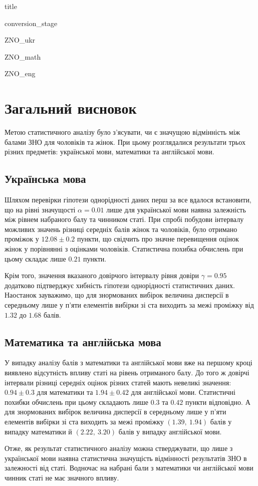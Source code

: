 \documentclass[a4paper,14pt]{extarticle} %
\numberwithin{equation}{section}
\begin{document}
{title}

\tableofcontents

\newpage
{conversion_stage}

\newpage
{ZNO_ukr}

\newpage
{ZNO_math}

\newpage
{ZNO_eng}

\newpage
\section*{Загальний висновок}

Метою статистичного аналізу було з'ясувати, чи є значущою відмінність між балами ЗНО для чоловіків 
та жінок. При цьому розглядалися результати трьох різних предметів: української мови, математики та 
англійської мови.

\subsection*{Українська мова}

Шляхом перевірки гіпотези однорідності даних перш за все вдалося встановити, що на рівні значущості $\alpha=0.01$ 
лише для української мови наявна залежність між рівнем набраного балу та чинником статі. При спробі побудови 
інтервалу можливих значень різниці середніх балів жінок та чоловіків, було отримано проміжок у $12.08\pm 0.2$ 
пункти, що свідчить про значне перевищення оцінок жінок у порівнянні з оцінками чоловіків. Статистична похибка 
обчислень при цьому складає лише $0.21$ пункти. 

Крім того, значення вказаного довірчого інтервалу рівня довіри $\gamma=0.95$ додатково підтверджує хибність 
гіпотези однорідності статистичних даних. Наостанок зауважимо, що для знормованих вибірок величина дисперсії 
в середньому лише у п'яти елементів вибірки зі ста виходить за межі проміжку від $1.32$ до $1.68$ балів.

\subsection*{Математика та англійська мова}

У випадку аналізу балів з математики та англійської мови вже на першому кроці виявлено відсутність впливу статі 
на рівень отриманого балу. До того ж довірчі інтервали різниці середніх оцінок різних статей мають невеликі 
значення: $0.94\pm 0.3$ для математики та $1.94\pm 0.42$ для англійської мови. Статистичні похибки обчислень 
при цьому складають лише $0.3$ та $0.42$ пункти відповідно. А для знормованих вибірок величина дисперсії 
в середньому лише у п'яти елементів вибірки зі ста виходить за межі проміжку $(1.39,\ 1.94)$ балів у випадку 
математики й $(2.22,\ 3.20)$ балів у випадку англійської мови.

\vspace{1cm}

Отже, як результат статистичного аналізу можна стверджувати, що лише з української мови наявна статистична 
значущість відмінності результатів ЗНО в залежності від статі. Водночас на набрані бали з математики чи 
англійської мови чинник статі не має значного впливу.
\end{document}
